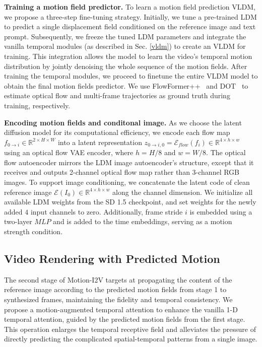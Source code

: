 \documentclass[10pt,twocolumn,letterpaper]{article}
\begin{document}
\noindent \textbf{Training a motion field predictor.} To learn a motion field prediction VLDM, we propose a three-step fine-tuning strategy. Initially, we tune a pre-trained LDM to predict a single displacement field conditioned on the reference image and text prompt. Subsequently, we freeze the tuned LDM parameters and integrate the vanilla temporal modules (as described in Sec. \ref{vldm}) to create an VLDM for training. This integration allows the model to learn the video's temporal motion distribution by jointly denoising the whole sequence of the motion fields. After training the temporal modules, we proceed to finetune the entire VLDM model to obtain the final motion fields predictor. We use FlowFormer++~\cite{shi2023flowformer++} and DOT~\cite{moing2023dense} to estimate optical flow and multi-frame trajectories as ground truth during training, respectively.

\noindent \textbf{Encoding motion fields and conditonal image.} As we choose the latent diffusion model for its computational efficiency, we encode each flow map $f_{0\rightarrow i} \in \mathbb{R}^{2 \times H\times W}$ into a latent representation $z_{0\rightarrow i,0}=\mathcal{E}_{flow}(f_i)\in \mathbb{R}^{4 \times h\times w}$ using an optical flow VAE encoder, where $h=H/8$ and $w=W/8$. The optical flow autoencoder mirrors the LDM image autoencoder's structure, except that it receives and outputs 2-channel optical flow map rather than 3-channel RGB images. To support image conditioning, we concatenate the latent code of clean reference image $\mathcal{E}(I_0)\in \mathbb{R}^{4 \times h\times w}$ along the channel dimension. We initialize all available LDM weights from the SD 1.5 checkpoint, and set weights for the newly added $4$ input channels to zero. Additionally, frame stride $i$ is embedded using a two-layer $MLP$ and is added to the time embeddings, serving as a motion strength condition.

\subsection{Video Rendering with Predicted Motion} \label{stage2}

The second stage of Motion-I2V targets at propagating the content of the reference image according to the predicted motion fields from stage 1 to synthesized frames, maintaining the fidelity and temporal consistency. We propose a motion-augmented temporal attention to enhance the vanilla 1-D temporal attention, guided by the predicted motion fields from the first stage. This operation enlarges the temporal receptive field and alleviates the pressure of directly predicting the complicated spatial-temporal patterns from a single image.
\end{document}

